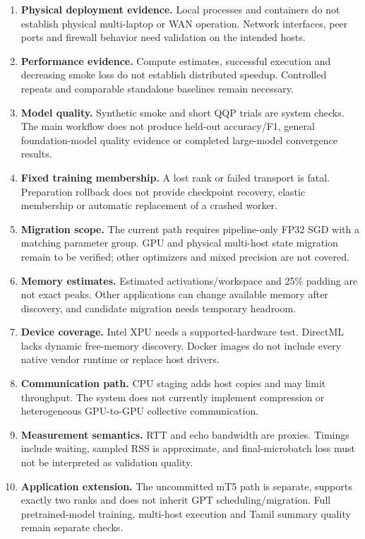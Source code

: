 \begin{enumerate}[leftmargin=1.1cm,itemsep=4pt]
  \item \textbf{Physical deployment evidence.} Local processes and containers do not establish physical multi-laptop or WAN operation. Network interfaces, peer ports and firewall behavior need validation on the intended hosts.
  \item \textbf{Performance evidence.} Compute estimates, successful execution and decreasing smoke loss do not establish distributed speedup. Controlled repeats and comparable standalone baselines remain necessary.
  \item \textbf{Model quality.} Synthetic smoke and short QQP trials are system checks. The main workflow does not produce held-out accuracy/F1, general foundation-model quality evidence or completed large-model convergence results.
  \item \textbf{Fixed training membership.} A lost rank or failed transport is fatal. Preparation rollback does not provide checkpoint recovery, elastic membership or automatic replacement of a crashed worker.
  \item \textbf{Migration scope.} The current path requires pipeline-only FP32 SGD with a matching parameter group. GPU and physical multi-host state migration remain to be verified; other optimizers and mixed precision are not covered.
  \item \textbf{Memory estimates.} Estimated activations/workspace and 25\% padding are not exact peaks. Other applications can change available memory after discovery, and candidate migration needs temporary headroom.
  \item \textbf{Device coverage.} Intel XPU needs a supported-hardware test. DirectML lacks dynamic free-memory discovery. Docker images do not include every native vendor runtime or replace host drivers.
  \item \textbf{Communication path.} CPU staging adds host copies and may limit throughput. The system does not currently implement compression or heterogeneous GPU-to-GPU collective communication.
  \item \textbf{Measurement semantics.} RTT and echo bandwidth are proxies. Timings include waiting, sampled RSS is approximate, and final-microbatch loss must not be interpreted as validation quality.
  \item \textbf{Application extension.} The uncommitted mT5 path is separate, supports exactly two ranks and does not inherit GPT scheduling/migration. Full pretrained-model training, multi-host execution and Tamil summary quality remain separate checks.
\end{enumerate}

